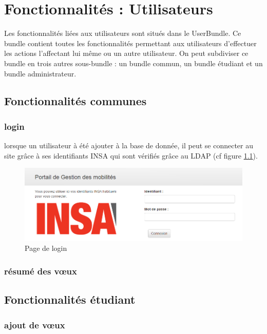 \chapter{Fonctionnalités : Utilisateurs}

Les fonctionnalités liées aux utilisateurs sont situés dans le UserBundle. Ce bundle contient toutes les fonctionnalités permettant aux utilisateurs d'effectuer les actions l'affectant lui même ou un autre utilisateur. On peut subdiviser ce bundle en trois autres sous-bundle : un bundle commun, un bundle étudiant et un bundle administrateur.

\section{Fonctionnalités communes}

\subsection{login}

lorsque un utilisateur à été ajouter à la base de donnée, il peut se connecter au site grâce à ses identifiants INSA qui sont vérifiés grâce au LDAP (cf figure \ref{log}).

\begin{figure}[H]
	\centering
	\includegraphics[scale=0.35]{images/log.png}
	\caption{Page de login}
	\label{log}
\end{figure}

\subsection{résumé des vœux}


\section{Fonctionnalités étudiant}

\subsection{ajout de vœux}

